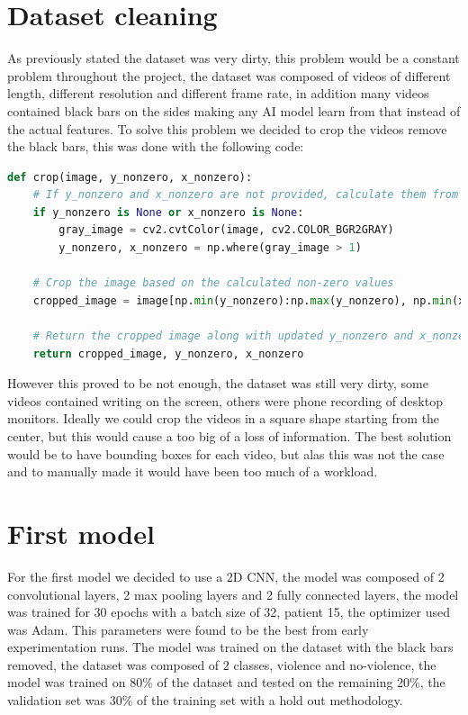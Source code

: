 \section{Dataset cleaning}
As previously stated the dataset was very dirty, this problem would be a constant problem throughout the project, the dataset was composed of videos of different length, different resolution and different frame rate, in addition many videos contained black bars on the sides making any AI model learn from that instead of the actual features. To solve this problem we decided to crop the videos remove the black bars, this was done with the following code:

\begin{lstlisting}[language=Python, caption={Image Cropper}, label={lst:ImageCropper}]
    def crop(image, y_nonzero, x_nonzero):
    # If y_nonzero and x_nonzero are not provided, calculate them from the grayscale version of the image
    if y_nonzero is None or x_nonzero is None:
        gray_image = cv2.cvtColor(image, cv2.COLOR_BGR2GRAY)
        y_nonzero, x_nonzero = np.where(gray_image > 1)

    # Crop the image based on the calculated non-zero values
    cropped_image = image[np.min(y_nonzero):np.max(y_nonzero), np.min(x_nonzero):np.max(x_nonzero)]

    # Return the cropped image along with updated y_nonzero and x_nonzero values
    return cropped_image, y_nonzero, x_nonzero
\end{lstlisting}

However this proved to be not enough, the dataset was still very dirty, some videos contained writing on the screen, others were phone recording of desktop monitors. Ideally we could crop the videos in a square shape starting from the center, but this would cause a too big of a loss of information. The best solution would be to have bounding boxes for each video, but alas this was not the case and to manually made it would have been too much of a workload.

\section{First model}
For the first model we decided to use a 2D CNN, the model was composed of 2 convolutional layers, 2 max pooling layers and 2 fully connected layers, the model was trained for 30 epochs with a batch size of 32, patient 15, the optimizer used was Adam. This parameters were found to be the best from early experimentation runs. The model was trained on the dataset with the black bars removed, the dataset was composed of 2 classes, violence and no-violence, the model was trained on 80\% of the dataset and tested on the remaining 20\%, the validation set was 30\% of the training set with a hold out methodology.  

